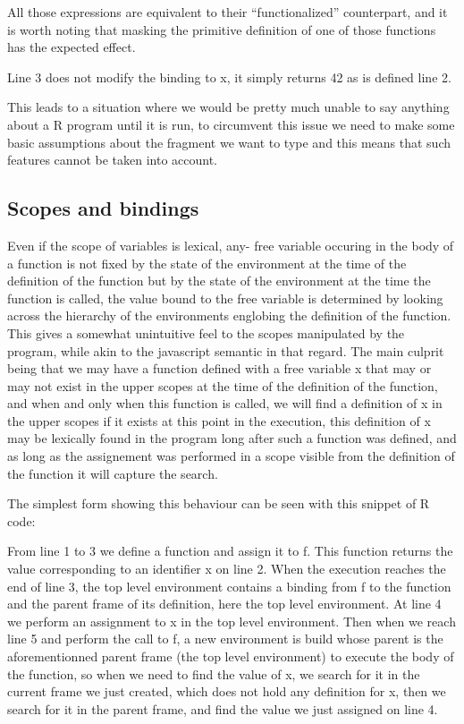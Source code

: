 

All those expressions are equivalent to their ``functionalized'' counterpart, and it is worth noting that masking the primitive definition of one of those functions has the expected effect.



Line 3 does not modify the binding to x, it simply returns 42 as is defined line 2.

This leads to a situation where we would be pretty much unable to say anything about a R program until it is run, to circumvent this issue we need to make some basic assumptions about the fragment we want to type and this means that such features cannot be taken into account.

\subsection{Scopes and bindings}

Even if the scope of variables is lexical, any- free variable occuring in the body of a function is not fixed by the state of the environment at the time of the definition of the function but by the state of the environment at the time the function is called, the value bound to the free variable is determined by looking across the hierarchy of the environments englobing the definition of the function. This gives a somewhat unintuitive feel to the scopes manipulated by the program, while akin to the javascript semantic in that regard. The main culprit being that we may have a function defined with a free variable x that may or may not exist in the upper scopes at the time of the definition of the function, and when and only when this function is called, we will find a definition of x in the upper scopes if it exists at this point in the execution, this definition of x may be lexically found in the program long after such a function was defined, and as long as the assignement was performed in a scope visible from the definition of the function it will capture the search.

The simplest form showing this behaviour can be seen with this snippet of R code:



From line 1 to 3 we define a function and assign it to f. This function returns the value corresponding to an identifier x on line 2. When the execution reaches the end of line 3, the top level environment contains a binding from f to the function and the parent frame of its definition, here the top level environment. At line 4 we perform an assignment to x in the top level environment. Then when we reach line 5 and perform the call to f, a new environment is build whose parent is the aforementionned parent frame (the top level environment) to execute the body of the function, so when we need to find the value of x, we search for it in the current frame we just created, which does not hold any definition for x, then we search for it in the parent frame, and find the value we just assigned on line 4.


